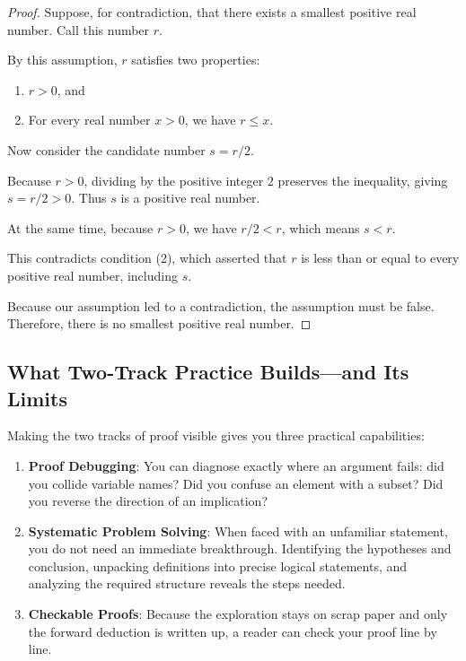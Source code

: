 \begin{proof}
Suppose, for contradiction, that there exists a smallest positive real number. Call this number $r$.

By this assumption, $r$ satisfies two properties:
\begin{enumerate}
  \item $r > 0$, and
  \item For every real number $x > 0$, we have $r \le x$.
\end{enumerate}
Now consider the candidate number $s = r/2$.

Because $r > 0$, dividing by the positive integer $2$ preserves the inequality, giving $s = r/2 > 0$. Thus $s$ is a positive real number.

At the same time, because $r > 0$, we have $r/2 < r$, which means $s < r$.

This contradicts condition (2), which asserted that $r$ is less than or equal to every positive real number, including $s$.

Because our assumption led to a contradiction, the assumption must be false. Therefore, there is no smallest positive real number.
\end{proof}

\subsection{What Two-Track Practice Builds---and Its Limits}

Making the two tracks of proof visible gives you three practical capabilities:
\begin{enumerate}
  \item \textbf{Proof Debugging}: You can diagnose exactly where an argument fails: did you collide variable names? Did you confuse an element with a subset? Did you reverse the direction of an implication?
  \item \textbf{Systematic Problem Solving}: When faced with an unfamiliar statement, you do not need an immediate breakthrough. Identifying the hypotheses and conclusion, unpacking definitions into precise logical statements, and analyzing the required structure reveals the steps needed.
  \item \textbf{Checkable Proofs}: Because the exploration stays on scrap paper and only the forward deduction is written up, a reader can check your proof line by line.
\end{enumerate}

